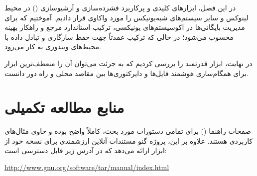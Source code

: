 در این فصل، ابزارهای کلیدی و پرکاربرد فشرده‌سازی و آرشیو‌سازی () در محیط لینوکس و سایر سیستم‌های شبه‌یونیکس را مورد واکاوی قرار دادیم. آموختیم که برای مدیریت بایگانی‌ها در اکوسیستم‌های یونیکسی، ترکیب  استاندارد مرجع و راهکار بهینه محسوب می‌شود؛ در حالی که ترکیب  عمدتاً جهت حفظ سازگاری و تبادل داده با محیط‌های ویندوزی به کار می‌رود.

در نهایت، ابزار قدرتمند  را بررسی کردیم که به جرئت می‌توان آن را منعطف‌ترین ابزار برای همگام‌سازی هوشمند فایل‌ها و دایرکتوری‌ها بین مقاصد محلی و راه دور دانست.

\section{منابع مطالعه تکمیلی}

صفحات راهنما () برای تمامی دستورات مورد بحث، کاملاً واضح بوده و حاوی مثال‌های کاربردی هستند. علاوه بر این، پروژه گنو مستندات آنلاین ارزشمندی برای نسخه خود از ابزار  ارائه می‌دهد که در آدرس زیر قابل دسترسی است:

\begin{latin}
\url{http://www.gnu.org/software/tar/manual/index.html}
\end{latin}